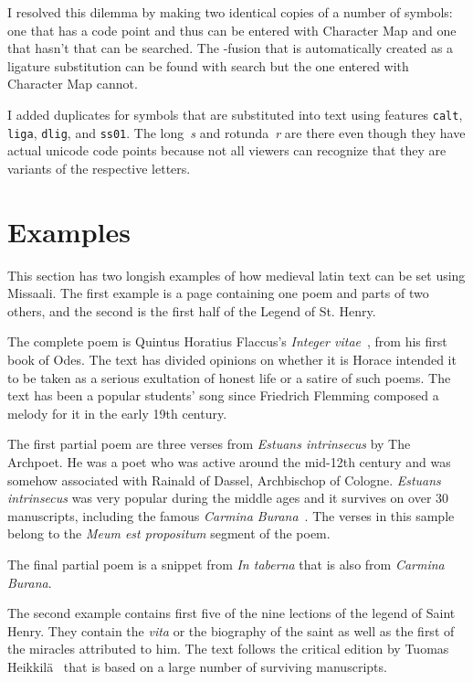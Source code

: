 \documentclass[a4paper, 12pt]{article}
\newcommand{\feature}[1]{\texttt{#1}}
\begin{document}
I resolved this dilemma by making two identical copies of a number of
symbols: one that has a code point and thus can be entered with
Character Map and one that hasn't that can be searched. The
-fusion that is automatically created as a ligature
substitution can be found with search but the one entered with
Character Map cannot. 

I added duplicates for symbols that are substituted into text using
features \feature{calt}, \feature{liga}, \feature{dlig}, and
\feature{ss01}. The long~\emph{s} and rotunda~\emph{r} are there even
though they have actual unicode code points because not all viewers
can recognize that they are variants of the respective letters.  


\label{pg:symbols_start}



\label{pg:symbols_end}


\section{Examples}

This section has two longish examples of how medieval latin text can
be set using Missaali. The first example is a page containing one poem
and parts of two others, and the second is the first half of the
Legend of St. Henry.

The complete poem is Quintus Horatius Flaccus's \emph{Integer
  vitae}~\cite{horatius}, from his first book of Odes. The text has
divided opinions on whether it is Horace intended it to be taken as a
serious exultation of honest life or a satire of such poems. The text
has been a popular students' song since Friedrich Flemming composed a
melody for it in the early 19th century.

The first partial poem are three verses from \emph{Estuans
  intrinsecus} by The Archpoet. He was a poet who was active around
the mid-12th century and was somehow associated with Rainald of
Dassel, Archbischop of Cologne. \emph{Estuans intrinsecus} was very
popular during the middle ages and it survives on over 30 manuscripts,
including the famous \emph{Carmina Burana}~\cite{carmina}. The verses
in this sample belong to the \emph{Meum est propositum} segment of the
poem. 

The final partial poem is a snippet from \emph{In taberna} that is
also from \emph{Carmina Burana}. 

The second example contains first five of the nine lections of the
legend of Saint Henry. They contain the \emph{vita} or the biography
of the saint as well as the first of the miracles attributed to him.
The text follows the critical edition by Tuomas
Heikkilä~\cite{legenda} that is based on a large number of surviving
manuscripts.
\end{document}
